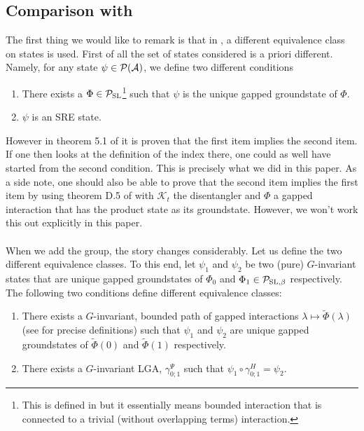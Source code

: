 \documentclass[11pt,a4paper,twoside]{article}
\numberwithin{equation}{section}
\begin{document}
\subsection{Comparison with \cite{ogata2021h3gmathbb}}\label{sec:SomeRemarks}
The first thing we would like to remark is that in \cite{ogata2021h3gmathbb}, a different equivalence class on states is used. First of all the set of states considered is a priori different. Namely, for any state $\psi\in \mathcal P(\mathcal A)$, we define two different conditions
\begin{enumerate}
	\item There exists a $\Phi\in\mathcal P_{\text{SL}}$\footnote{This is defined in \cite{ogata2021h3gmathbb} but it essentially means bounded interaction that is connected to a trivial (without overlapping terms) interaction.} such that $\psi$ is the unique gapped groundstate of $\Phi$.
	\item $\psi$ is an SRE state.
\end{enumerate}
However in theorem 5.1 of \cite{ogata2021h3gmathbb} it is proven that the first item implies the second item. If one then looks at the definition of the index there, one could as well have started from the second condition. This is precisely what we did in this paper. As a side note, one should also be able to prove that the second item implies the first item by using theorem D.5 of \cite{ogata2021h3gmathbb} with $\mathcal{K}_t$ the disentangler and $\Phi$ a gapped interaction that has the product state as its groundstate. However, we won't work this out explicitly in this paper.\\\\
When we add the group, the story changes considerably. Let us define the two different equivalence classes. To this end, let $\psi_1$ and $\psi_2$ be two (pure) $G$-invariant states that are unique gapped groundstates of $\Phi_0$ and $\Phi_1\in\mathcal P_{\text{SL},\beta}$ respectively. The following two conditions define different equivalence classes:
\begin{enumerate}
	\item There exists a $G$-invariant, bounded path of gapped interactions $\lambda\mapsto\tilde\Phi(\lambda)$ (see \cite{ogata2021h3gmathbb} for precise definitions) such that $\psi_1$ and $\psi_2$ are unique gapped groundstates of $\tilde{\Phi}(0)$ and $\tilde{\Phi}(1)$ respectively.
	\item There exists a $G$-invariant LGA, $\gamma^\Psi_{0;1}$ such that $\psi_1\circ\gamma^H_{0;1}=\psi_2$.
\end{enumerate}
\end{document}
